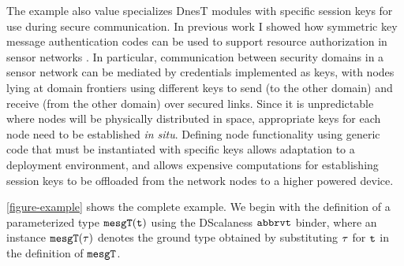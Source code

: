 The example also value specializes DnesT modules with specific session keys for use during
secure communication. In previous work I showed how symmetric key message authentication codes
can be used to support resource authorization in sensor networks
\cite{chapin-skalka-SpartanRPC,chapin-skalka-SpartanRPCTR}. In particular, communication between
security domains in a sensor network can be mediated by credentials implemented as keys, with
nodes lying at domain frontiers using different keys to send (to the other domain) and receive
(from the other domain) over secured links. Since it is unpredictable where nodes will be
physically distributed in space, appropriate keys for each node need to be established \emph{in
  situ}. Defining node functionality using generic code that must be instantiated with specific
keys allows adaptation to a deployment environment, and allows expensive computations for
establishing session keys to be offloaded from the network nodes to a higher powered device.

\autoref{figure-example} shows the complete example. We begin with the definition of a
parameterized type $\tt{mesgT(t)}$ using the DScalaness $\tt{abbrvt}$ binder, where an instance
$\tt{mesgT}(\t)$ denotes the ground type obtained by substituting $\t$ for $\tt{t}$ in the
definition of $\tt{mesgT}$.

